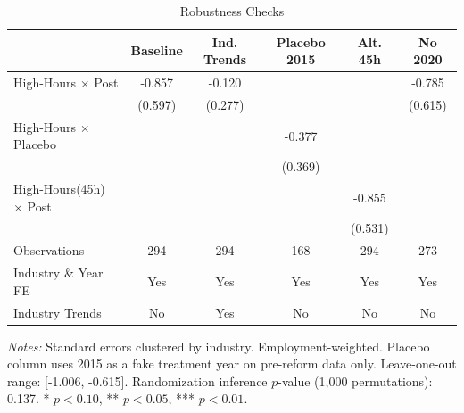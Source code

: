 \begin{table}[t]
\centering
\caption{Robustness Checks}
\label{tab:robustness}
\begin{tabular}{lccccc}
\hline\hline
 & Baseline & Ind. Trends & Placebo 2015 & Alt. 45h & No 2020 \\
\hline
High-Hours $\times$ Post & -0.857 & -0.120 & & & -0.785 \\
 & (0.597) & (0.277) & & & (0.615) \\
High-Hours $\times$ Placebo & & & -0.377 & & \\
 & & & (0.369) & & \\
High-Hours(45h) $\times$ Post & & & & -0.855 & \\
 & & & & (0.531) & \\
\hline
Observations & 294 & 294 & 168 & 294 & 273 \\
Industry \& Year FE & Yes & Yes & Yes & Yes & Yes \\
Industry Trends & No & Yes & No & No & No \\
\hline\hline
\end{tabular}
\begin{tablenotes}
\small
\item \textit{Notes:} Standard errors clustered by industry. Employment-weighted. Placebo column uses 2015 as a fake treatment year on pre-reform data only. Leave-one-out range: [-1.006, -0.615]. Randomization inference $p$-value (1,000 permutations): 0.137. * $p<0.10$, ** $p<0.05$, *** $p<0.01$.
\end{tablenotes}
\end{table}
